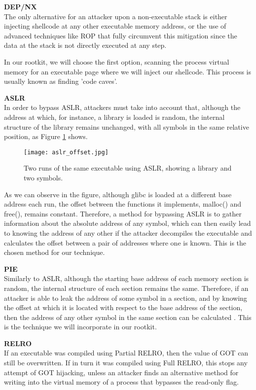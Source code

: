 \textbf{DEP/NX}\\
The only alternative for an attacker upon a non-executable stack is either injecting shellcode at any other executable memory address, or the use of advanced techniques like ROP that fully circumvent this mitigation since the data at the stack is not directly executed at any step.

In our rootkit, we will choose the first option, scanning the process virtual memory for an executable page where we will inject our shellcode. This process is usually known as finding 'code caves'.

\textbf{ASLR}\\
In order to bypass ASLR, attackers must take into account that, although the address at which, for instance, a library is loaded is random, the internal structure of the library remains unchanged, with all symbols in the same relative position, as Figure \ref{fig:aslr_offset} shows.

\begin{figure}[htbp]
	\centering
	\texttt{[image: aslr\_offset.jpg]}
	\caption{Two runs of the same executable using ASLR, showing a library and two symbols.}
	\label{fig:aslr_offset}
\end{figure}

As we can observe in the figure, although glibc is loaded at a different base address each run, the offset between the functions it implements, malloc() and free(), remains constant. Therefore, a method for bypassing ASLR is to gather information about the absolute address of any symbol, which can then easily lead to knowing the address of any other if the attacker decompiles the executable and calculates the offset between a pair of addresses where one is known. This is the chosen method for our technique.

\textbf{PIE}\\
Similarly to ASLR, although the starting base address of each memory section is random, the internal structure of each section remains the same. Therefore, if an attacker is able to leak the address of some symbol in a section, and by knowing the offset at which it is located with respect to the base address of the section, then the address of any other symbol in the same section can be calculated \cite{pie_exploit}. This is the technique we will incorporate in our rootkit.

\textbf{RELRO}\\
If an executable was compiled using Partial RELRO, then the value of GOT can still be overwritten. If in turn it was compiled using Full RELRO, this stops any attempt of GOT hijacking, unless an attacker finds an alternative method for writing into the virtual memory of a process that bypasses the read-only flag. 


